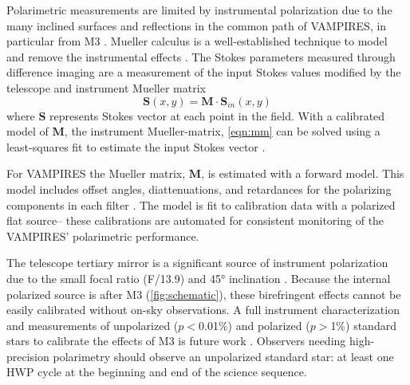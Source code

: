 Polarimetric measurements are limited by instrumental polarization due to the many inclined surfaces and reflections in the common path of VAMPIRES, in particular from M3 \citep{tinbergen_accurate_2007}. Mueller calculus is a well-established technique to model and remove the instrumental effects \citep{perrin_polarimetry_2015,holstein_polarimetric_2020,joost_t_hart_full_2021}. The Stokes parameters measured through difference imaging are a measurement of the input Stokes values modified by the telescope and instrument Mueller matrix
\begin{equation}
    \mathbf{S}(x, y) = \mathbf{M}\cdot\mathbf{S}_{in}(x, y)
    \label{eqn:mm}
\end{equation}
where $\mathbf{S}$ represents Stokes vector at each point in the field. With a calibrated model of $\mathbf{M}$, the instrument Mueller-matrix, \autoref{eqn:mm} can be solved using a least-squares fit to estimate the input Stokes vector \citep{perrin_polarimetry_2015}.

For VAMPIRES the Mueller matrix, $\mathbf{M}$, is estimated with a forward model. This model includes offset angles, diattenuations, and retardances for the polarizing components in each filter \citep{zhang_characterizing_2023}. The model is fit to calibration data with a polarized flat source-- these calibrations are automated for consistent monitoring of the VAMPIRES' polarimetric performance. 

The telescope tertiary mirror is a significant source of instrument polarization due to the small focal ratio (F/13.9) and \ang{45} inclination \citep{schmid_spherezimpol_2018,van_holstein_polarization-dependent_2023}. Because the internal polarized source is after M3 (\autoref{fig:schematic}), these birefringent effects cannot be easily calibrated without on-sky observations. A full instrument characterization and measurements of unpolarized ($p<$0.01\%) and polarized ($p>$1\%) standard stars to calibrate the effects of M3 is future work \citep{zhang_characterizing_2023}. Observers needing high-precision polarimetry should observe an unpolarized standard star: at least one HWP cycle at the beginning and end of the science sequence.


